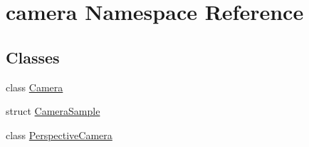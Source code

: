 \hypertarget{namespacecamera}{}\section{camera Namespace Reference}
\label{namespacecamera}
\subsection*{Classes}
\begin{DoxyCompactItemize}
\item 
class \mbox{\hyperlink{classcamera_1_1Camera}{Camera}}
\item 
struct \mbox{\hyperlink{structcamera_1_1CameraSample}{Camera\+Sample}}
\item 
class \mbox{\hyperlink{classcamera_1_1PerspectiveCamera}{Perspective\+Camera}}
\end{DoxyCompactItemize}
